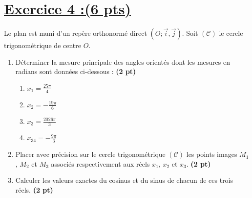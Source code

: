 \documentclass[12pt,a4paper]{article}
\begin{document}
\section*{\underline{Exercice 4 :(6 pts)} }

Le plan est muni d'un repère orthonormé direct $(O; \vec{i}, \vec{j})$. Soit $(\mathcal{C})$ le cercle trigonométrique de centre $O$.

\begin{enumerate}
    \item Déterminer la mesure principale des angles orientés dont les mesures en radians sont données ci-dessous : \hfill \textbf{(2 pt)}
    \begin{enumerate}
        \item $x_1 = \frac{25\pi}{4}$
        \item $x_2 = -\frac{19\pi}{6}$
        \item $x_3 = \frac{2026\pi}{3}$
        \item $x_34 = -\frac{9\pi}{3}$
    \end{enumerate}

    \item Placer avec précision sur le cercle trigonométrique $(\mathcal{C})$ les points images $M_1$, $M_2$ et $M_3$ associés respectivement aux réels $x_1$, $x_2$ et $x_3$. \hfill \textbf{(2 pt)}

    \item Calculer les valeurs exactes du cosinus et du sinus de chacun de ces trois réels. \hfill \textbf{(2 pt)}

\end{enumerate}
\end{document}

